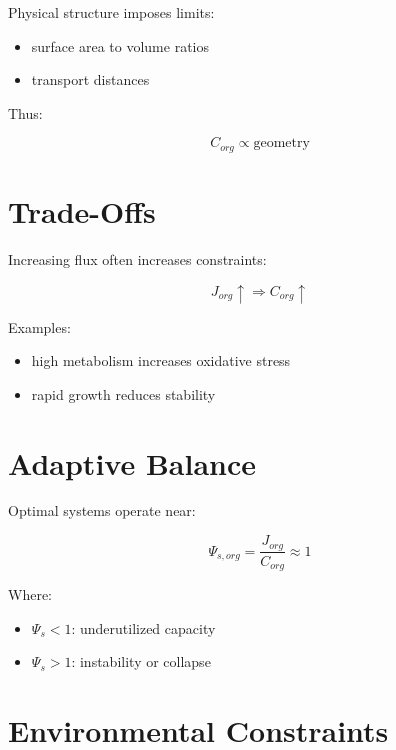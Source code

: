 \documentclass[11pt]{article}
\begin{document}
Physical structure imposes limits:

\begin{itemize}
    \item surface area to volume ratios
    \item transport distances
\end{itemize}

Thus:

\begin{equation}
C_{org} \propto \text{geometry}
\end{equation}

\section{Trade-Offs}

Increasing flux often increases constraints:

\begin{equation}
J_{org} \uparrow \Rightarrow C_{org} \uparrow
\end{equation}

Examples:

\begin{itemize}
    \item high metabolism increases oxidative stress
    \item rapid growth reduces stability
\end{itemize}

\section{Adaptive Balance}

Optimal systems operate near:

\begin{equation}
\Psi_{s,org} = \frac{J_{org}}{C_{org}} \approx 1
\end{equation}

Where:

\begin{itemize}
    \item $\Psi_s < 1$: underutilized capacity
    \item $\Psi_s > 1$: instability or collapse
\end{itemize}

\section{Environmental Constraints}
\end{document}
